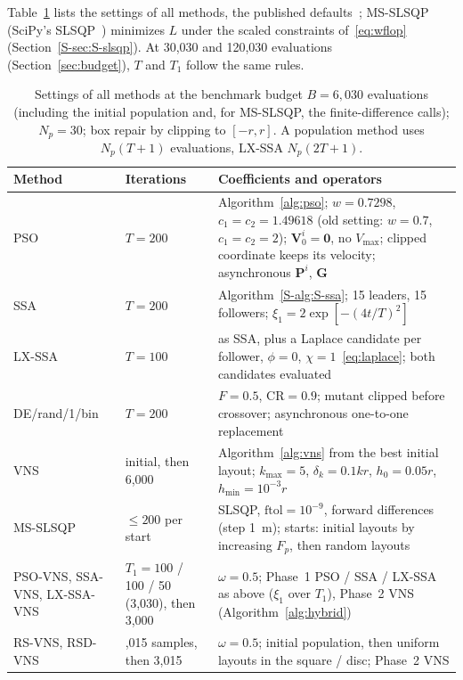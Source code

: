 Table~\ref{tab:params} lists the settings of all methods, the published defaults~\cite{Clerc2002,Mirjalili2017,Solanki2023,Storn1997,Mladenovic2008}; MS-SLSQP (SciPy's SLSQP~\cite{Kraft1988}) minimizes $L$ under the scaled constraints of~\eqref{eq:wflop} (Section~\ref{S-sec:S-slsqp}). At 30,030 and 120,030 evaluations (Section~\ref{sec:budget}), $T$ and $T_1$ follow the same rules.
\begin{table}[!t]
\centering
\caption{Settings of all methods at the benchmark budget $B=6{,}030$ evaluations (including the initial population and, for MS-SLSQP, the finite-difference calls); $N_p=30$; box repair by clipping to $[-r,r]$. A population method uses $N_p(T+1)$ evaluations, LX-SSA $N_p(2T+1)$.}
\label{tab:params}
\scriptsize\setlength{\tabcolsep}{3.5pt}
\begin{tabular}{@{}>{\raggedright\arraybackslash}p{}>{\raggedright\arraybackslash}p{}>{\raggedright\arraybackslash}p{}@{}}
\toprule
Method & Iterations & Coefficients and operators \\
\midrule
PSO & $T=200$ & Algorithm~\ref{alg:pso}; $w=0.7298$, $c_1=c_2=1.49618$ (old setting: $w=0.7$, $c_1=c_2=2$); $\mathbf V^i_0=\mathbf 0$, no $V_{\max}$; clipped coordinate keeps its velocity; asynchronous $\mathbf P^i$, $\mathbf G$ \\
SSA & $T=200$ & Algorithm~\ref{S-alg:S-ssa}; 15 leaders, 15 followers; $\xi_1=2\exp[-(4t/T)^2]$ \\
LX-SSA & $T=100$ & as SSA, plus a Laplace candidate per follower, $\phi=0$, $\chi=1$~\eqref{eq:laplace}; both candidates evaluated \\
DE/rand/1/bin & $T=200$ & $F=0.5$, $\mathrm{CR}=0.9$; mutant clipped before crossover; asynchronous one-to-one replacement \\
VNS & 30 initial, then 6,000 & Algorithm~\ref{alg:vns} from the best initial layout; $k_{\max}=5$, $\delta_k=0.1kr$, $h_0=0.05r$, $h_{\min}=10^{-3}r$ \\
MS-SLSQP & $\le200$ per start & SLSQP, $\mathrm{ftol}=10^{-9}$, forward differences (step 1~m); starts: initial layouts by increasing $F_p$, then random layouts \\
PSO-VNS, SSA-VNS, LX-SSA-VNS & $T_1=100$ / 100 / 50 (3,030), then 3,000 & $\omega=0.5$; Phase~1 PSO / SSA / LX-SSA as above ($\xi_1$ over $T_1$), Phase~2 VNS (Algorithm~\ref{alg:hybrid}) \\
RS-VNS, RSD-VNS & 3,015 samples, then 3,015 & $\omega=0.5$; initial population, then uniform layouts in the square / disc; Phase~2 VNS \\
\bottomrule
\end{tabular}
\end{table}

